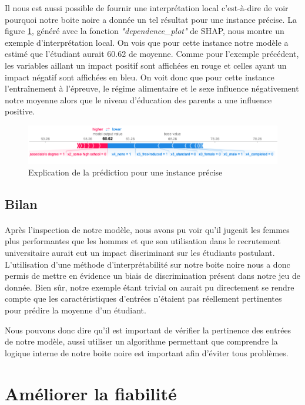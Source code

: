 Il nous est aussi possible de fournir une interprétation local c'est-à-dire de voir pourquoi notre boite noire a donnée un tel résultat pour une instance précise. La figure \ref{shapPlotLocal}, généré avec la fonction \textit{"dependence\_plot"} de SHAP, nous montre un exemple d'interprétation local. On vois que pour cette instance notre modèle a estimé que l'étudiant aurait 60.62 de moyenne. Comme pour l'exemple précédent, les variables aillant un impact positif sont affichées en rouge et celles ayant un impact négatif sont affichées en bleu. On voit donc que pour cette instance l'entraînement à l'épreuve, le régime alimentaire et le sexe influence négativement notre moyenne alors que le niveau d’éducation des parents a une influence positive.
\begin{figure}[h]
    \includegraphics[scale=0.5]{src_img/shapPlotLocal.png}
    \caption{Explication de la prédiction pour une instance précise}
    \label{shapPlotLocal}
\end{figure}

\subsection{Bilan}
 \paragraph{}Après l'inspection de notre modèle, nous avons pu voir qu'il jugeait les femmes plus performantes que les hommes et que son utilisation dans le recrutement universitaire aurait eut un impact discriminant sur les étudiants postulant. L'utilisation d'une méthode d'interprétabilité sur notre boite noire nous a donc permis de mettre en évidence un biais de discrimination présent dans notre jeu de donnée. Bien sûr, notre exemple étant trivial on aurait pu directement se rendre compte que les caractéristiques d'entrées n'étaient pas réellement pertinentes pour prédire la moyenne d'un étudiant.\par
 Nous pouvons donc dire qu'il est important de vérifier la pertinence des entrées de notre modèle, aussi utiliser un algorithme permettant que comprendre la logique interne de notre boite noire est important afin d'éviter tous problèmes.

\section{Améliorer la fiabilité}
